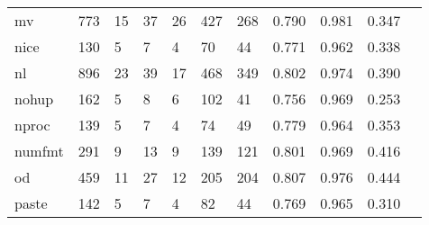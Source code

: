 \begin{longtable}{lp{1.10cm}p{1.10cm}p{1.10cm}p{1.10cm}p{1.10cm}p{1.10cm}p{1.10cm}p{1.10cm}p{1.10cm}p{1.10cm}}
mv        &                    773 &                                 15 &                                37 &                               26 &                               427 &                             268 &                             0.790 &                                 0.981 &                               0.347 \\
nice      &                    130 &                                  5 &                                 7 &                                4 &                                70 &                              44 &                             0.771 &                                 0.962 &                               0.338 \\
nl        &                    896 &                                 23 &                                39 &                               17 &                               468 &                             349 &                             0.802 &                                 0.974 &                               0.390 \\
nohup     &                    162 &                                  5 &                                 8 &                                6 &                               102 &                              41 &                             0.756 &                                 0.969 &                               0.253 \\
nproc     &                    139 &                                  5 &                                 7 &                                4 &                                74 &                              49 &                             0.779 &                                 0.964 &                               0.353 \\
numfmt    &                    291 &                                  9 &                                13 &                                9 &                               139 &                             121 &                             0.801 &                                 0.969 &                               0.416 \\
od        &                    459 &                                 11 &                                27 &                               12 &                               205 &                             204 &                             0.807 &                                 0.976 &                               0.444 \\
paste     &                    142 &                                  5 &                                 7 &                                4 &                                82 &                              44 &                             0.769 &                                 0.965 &                               0.310 \\

\end{longtable}
